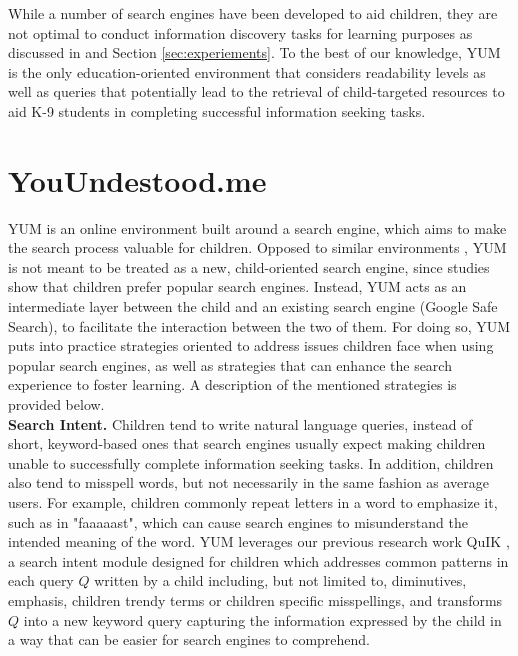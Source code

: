 \documentclass{sig-alternate-05-2015}
\begin{document}
While a number of search engines have been developed to aid children, they are not optimal to conduct information discovery tasks for learning purposes as discussed in \cite{Gos13} and Section \ref{sec:experiements}. 
 To the best of our knowledge, YUM is the only education-oriented environment that considers readability levels as well as queries that potentially lead to the retrieval of child-targeted resources to aid K-9 students in completing successful information seeking tasks.





\section{YouUndestood.me}
\label{sec:method}
YUM is an online environment built around a search engine, which aims to make the search process valuable for children. Opposed to similar environments \cite{Ust14}, YUM is not meant to be treated as a new, child-oriented search engine, since studies \cite{Bil13} show that children prefer popular search engines. Instead, YUM acts as an intermediate layer between the child and an existing search engine (Google Safe Search), to facilitate the interaction between the two of them. For doing so, YUM puts into practice strategies oriented to address issues children face when using popular search engines, as well as strategies that can enhance the search experience to foster learning.  A description of the mentioned strategies is provided below.\\


\noindent
\textbf{Search Intent.} Children tend to write natural language queries, instead of short, keyword-based ones that search engines usually expect \cite{Rie16} making children unable to successfully complete information seeking tasks. In addition, children also tend to misspell words, but not necessarily in the same fashion as average users. For example, children commonly repeat letters in a word to emphasize it, such as in "faaaaast", which can cause search engines to misunderstand the intended meaning of the word. YUM leverages our previous research work QuIK \cite{Quik}, a search intent module designed  for children which addresses common patterns in each query $Q$ written by a child including, but not limited to, diminutives, emphasis, children trendy terms or children specific misspellings, and transforms $Q$ into a new keyword query capturing the information expressed by the child in a way that can be easier for search engines to comprehend.\\
\end{document}
